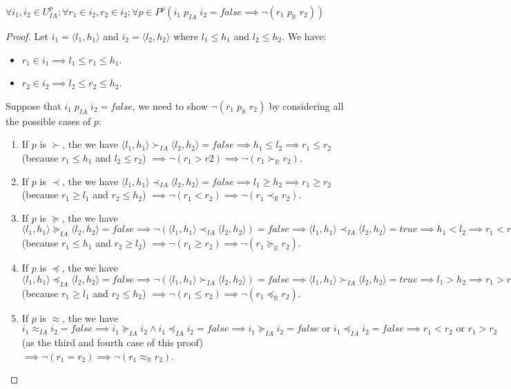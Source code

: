 \begin{lemma} \label{lemma:IA-R-OP}
$\forall i_1, i_2 \in U^p_{IA}; \forall r_1 \in i_2, r_2 \in i_2; \forall p \in P^p (i_1 \; p_{IA} \; i_2 = false \implies \neg(r_1 \; p_\mathbb{R} \; r_2))$
\end{lemma}

\begin{proof}
Let $i_1 = \langle l_1, h_1\rangle $ and $i_2 = \langle l_2, h_2\rangle $ where $l_1 \le h_1$ and $l_2 \le h_2$. We have: 
\begin{itemize}
\item $r_1 \in i_1 \implies l_1 \le r_1 \le h_1$. 
\item $r_2 \in i_2 \implies l_2 \le r_2 \le h_2$. 
\end{itemize}
Suppose  that $i_1 \; p_{IA} \; i_2 = false$, we need to show $\neg(r_1 \; p_\mathbb{R} \; r_2)$ by considering all the possible cases of $p$:
\begin{enumerate}
\item If $p$ is $\succ$, the we have $\langle l_1, h_1\rangle  \succ_{IA} \langle l_2, h_2\rangle  = false \implies h_1 \le l_2 \implies r_1 \le r_2$ (because $r_1 \le h_1$ and $l_2 \le r_2$) $\implies \neg(r_1 > r2) \implies \neg(r_1 \succ_\mathbb{R} r_2)$.
\item If $p$ is $\prec$, the we have $\langle l_1, h_1\rangle  \prec_{IA} \langle l_2, h_2\rangle  = false \implies l_1 \ge h_2 \implies r_1 \ge r_2$ (because $r_1 \ge l_1$ and $r_2 \le h_2$) $\implies \neg(r_1 < r_2) \implies \neg(r_1 \prec_\mathbb{R} r_2)$.
\item If $p$ is $\succeq$, the we have $\langle l_1, h_1\rangle  \succeq_{IA} \langle l_2, h_2\rangle  = false \implies \neg (\langle l_1, h_1\rangle  \prec_{IA} \langle l_2, h_2\rangle ) = false \implies \langle l_1, h_1\rangle  \prec_{IA} \langle l_2, h_2\rangle  = true \implies h_1 < l_2 \implies r_1 < r_2$ (because $r_1 \le h_1$ and $r_2 \ge l_2$) $\implies \neg(r_1 \ge r_2) \implies \neg(r_1 \succeq_\mathbb{R} r_2)$.
\item If $p$ is $\preceq$, the we have $\langle l_1, h_1\rangle  \preceq_{IA} \langle l_2, h_2\rangle  = false \implies \neg (\langle l_1, h_1\rangle  \succ_{IA} \langle l_2, h_2\rangle ) = false \implies \langle l_1, h_1\rangle  \succ_{IA} \langle l_2, h_2\rangle  = true \implies l_1 > h	_2 \implies r_1 > r_2$ (because $r_1 \ge l_1$ and $r_2 \le h_2$) $\implies \neg(r_1 \le r_2) \implies \neg(r_1 \preceq_\mathbb{R} r_2)$.
\item If $p$ is $\approx$, the we have $i_1 \approx_{IA} i_2 = false \implies i_1 \succeq_{IA} i_2 \wedge i_1 \preceq_{IA} i_2 = false \implies i_1 \succeq_{IA} i_2 = false \text{ or } i_1 \preceq_{IA} i_2 = false \implies r_1 < r_2 \text{ or } r_1 > r_2$ (as the third and fourth case of this proof) $\implies \neg(r_1 = r_2) \implies \neg(r_1 \approx_\mathbb{R} r_2)$.

\end{enumerate}
\end{proof}

